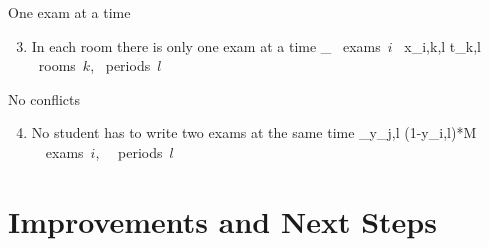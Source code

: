 \documentclass[10pt]{beamer}
\def\ba#1\ea{\begin{align*}#1\end{align*}}
\begin{document}
         \begin{frame}{One exam at a time}
         	\begin{enumerate}
         		\setcounter{enumi}{2}     
         		\item In each room there is only one exam at a time
         		\ba
         		\sum_{ \forall \mbox{\small{ exams $i$ }}} x_{i,k,l} \leq t_{k,l} \;\;\;\;\;\;\;\;\;  \forall \mbox{\small{ rooms $k$}}, \forall \mbox{\small{ periods $l$ }}
         		\ea
         	\end{enumerate}
         \end{frame}
        
        \begin{frame}{No conflicts}
        	\begin{enumerate}
        		\setcounter{enumi}{3}
        		\item No student has to write two exams at the same time
        		\ba
        		\sum_{}y_{j,l}  \leq (1-y_{i,l})*M \;\;\;\ \forall \mbox{\small{ exams $i$, }}  \forall \mbox{\small{ periods $l$ }}
        		\ea
        	\end{enumerate}
        \end{frame}
        
        \section{Improvements and Next Steps}
        
        
        
        
        
        
        
        
        
        
        
\end{document}
